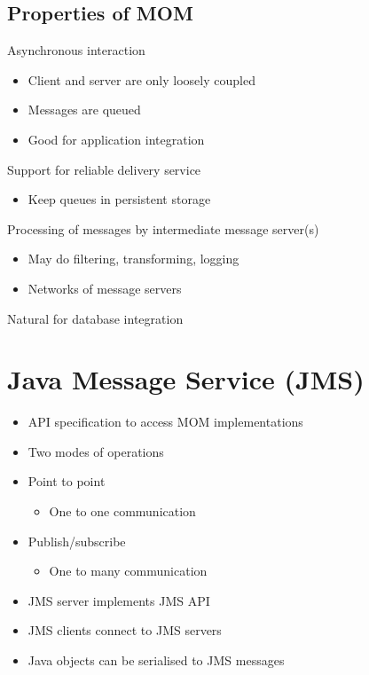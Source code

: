 \documentclass{article}[18pt]
\begin{document}
\subsection{Properties of MOM}
Asynchronous interaction
\begin{itemize}
	\item Client and server are only loosely coupled
	\item Messages are queued
	\item Good for application integration
\end{itemize}
Support for reliable delivery service
\begin{itemize}
	\item Keep queues in persistent storage
\end{itemize}
Processing of messages by intermediate message server(s)
\begin{itemize}
	\item May do filtering, transforming, logging
	\item Networks of message servers
\end{itemize}
Natural for database integration
\section{Java Message Service (JMS)}
\begin{itemize}
	\item API specification to access MOM implementations
	\item Two modes of operations 
	\item Point to point
	\begin{itemize}
		\item One to one communication
	\end{itemize}
	\item Publish/subscribe
	\begin{itemize}
		\item One to many communication
	\end{itemize}
	\item JMS server implements JMS API 
	\item JMS clients connect to JMS servers
	\item Java objects can be serialised to JMS messages
\end{itemize}
\end{document}
